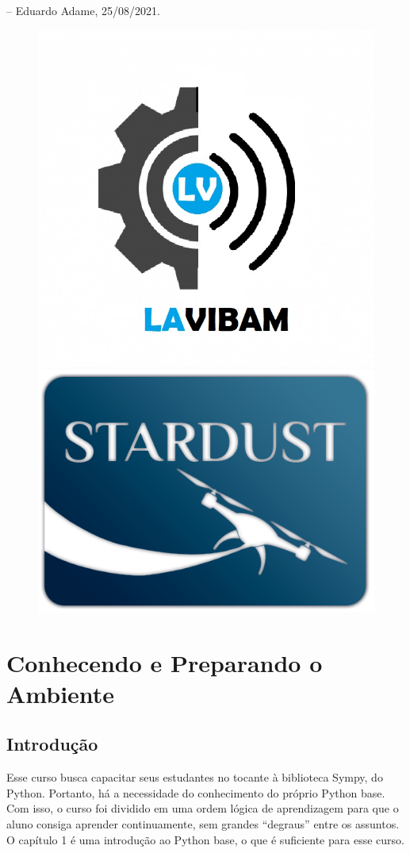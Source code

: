 \documentclass[a4paper, 11pt, brazilian]{article}
\begin{document}
    -- Eduardo Adame, 25/08/2021. 
    
    \begin{figure}[!b]
    \centering
    \includegraphics[width=.4\textwidth]{lav.jpg}\\
    \includegraphics[width=.4\textwidth]{std.png}
    \end{figure}
    
    \newpage
    \setcounter{page}{1}
    \tableofcontents
    \newpage
    \setcounter{page}{1}
    
    \hypertarget{conhecendo-e-preparando-o-ambiente}{%
\section{Conhecendo e Preparando o
Ambiente}\label{conhecendo-e-preparando-o-ambiente}}

\hypertarget{introduuxe7uxe3o}{%
\subsection{Introdução}\label{introduuxe7uxe3o}}

Esse curso busca capacitar seus estudantes no tocante à biblioteca
Sympy, do Python. Portanto, há a necessidade do conhecimento do próprio
Python base. Com isso, o curso foi dividido em uma ordem lógica de
aprendizagem para que o aluno consiga aprender continuamente, sem
grandes ``degraus'' entre os assuntos. O capítulo 1 é uma introdução ao
Python base, o que é suficiente para esse curso.
\end{document}
